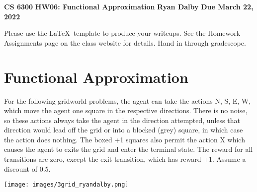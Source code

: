 \documentclass[12pt]{article}
\begin{document}
\begin{center} 
{\bf CS 6300} \hfill {\large\bf HW06: Functional Approximation} \hfill {\bf Ryan Dalby} \hfill {\bf Due March 22, 2022}
\end{center}

\noindent
Please use the \LaTeX\ template to produce your writeups. See the
Homework Assignments page on the class website for details.  Hand in
through gradescope.

\section{Functional Approximation}

For the following gridworld problems, the agent can take the actions
N, S, E, W, which move the agent one square in the respective
directions. There is no noise, so these actions always take the agent
in the direction attempted, unless that direction would lead off the
grid or into a blocked (grey) square, in which case the action does
nothing. The boxed +1 squares also permit the action X which causes
the agent to exits the grid and enter the terminal state. The reward
for all transitions are zero, except the exit transition, which has
reward +1. Assume a discount of 0.5.

\begin{center}
\texttt{[image: images/3grid\_ryandalby.png]}
\end{center}
\end{document}

